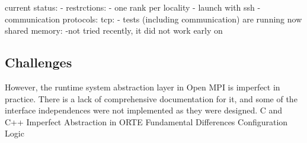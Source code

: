 current status:
- restrctions: - one rank per locality
- launch with ssh
- communication protocols:
tcp: - tests (including communication) are running now
shared memory: -not tried recently, it did not work early on


\subsection{Challenges}
However, the runtime system abstraction layer in Open MPI is imperfect in practice. There is a lack of comprehensive documentation for it, and some of the interface independences were not implemented as they were designed.
C and C++
Imperfect Abstraction in ORTE
Fundamental Differences
Configuration Logic

\fi
